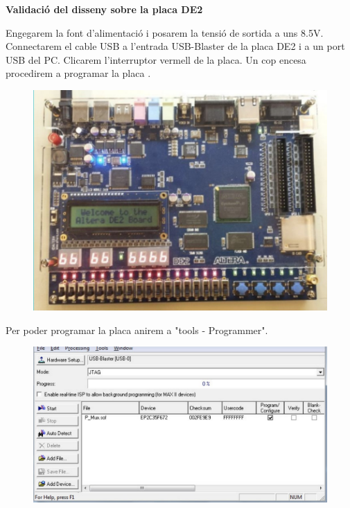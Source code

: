 \documentclass[12pt, a4papre]{article}
\begin{document}
	
	\textbf{\large{Validació del disseny sobre la placa DE2}}	
	
	Engegarem la font d’alimentació i posarem la tensió de sortida a uns 8.5V. Connectarem el cable
	USB a l’entrada USB-Blaster de la placa DE2 i a un port USB del PC.  Clicarem l’interruptor vermell de la placa.
	Un cop encesa  procedirem a programar la placa .
	
	\begin{figure}[H]
		\begin{center}
		\includegraphics[width=120mm]{placa.jpeg}
		\end{center}
	\end{figure}
	
	
	Per poder programar la placa anirem a "tools - Programmer".
	\begin{figure}[H]
		\begin{center}
		\includegraphics[width=150mm]{programacioplaca1.jpeg}
		\end{center}
	\end{figure}
	
\end{document}
